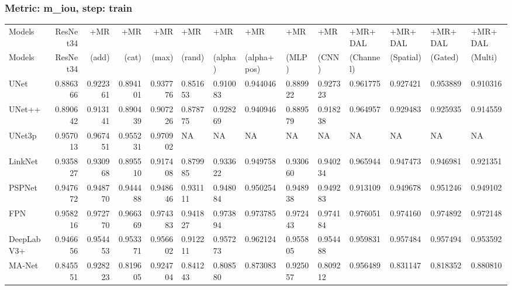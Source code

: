 \documentclass{article}
\begin{document}
\subsubsection{Metric: m\_iou, step: train}
\begin{tabular}{lrrrrlllllllll}
\toprule
Models & ResNet34 & +MR  & +MR  & +MR  & +MR  & +MR  & +MR  & +MR  & +MR  & +MR+DAL & +MR+DAL & +MR+DAL & +MR+DAL \\
Models & ResNet34 &  (add) &  (cat) &  (max) &  (rand) &  (alpha) &  (alpha+pos) &  (MLP) &  (CNN) & (Channel) & (Spatial) & (Gated) & (Multi) \\
\midrule
UNet & 0.886366 & 0.922361 & 0.894101 & 0.937776 & 0.851653 & 0.910083 & 0.944046 & 0.889922 & 0.927323 & 0.961775 & 0.927421 & 0.953889 & 0.910316 \\
UNet++ & 0.890642 & 0.913141 & 0.890439 & 0.907226 & 0.878775 & 0.928269 & 0.940946 & 0.889579 & 0.918238 & 0.964957 & 0.929483 & 0.925935 & 0.914559 \\
UNet3p & 0.957013 & 0.967451 & 0.955231 & 0.970902 & NA & NA & NA & NA & NA & NA & NA & NA & NA \\
LinkNet & 0.935827 & 0.930968 & 0.895510 & 0.917408 & 0.879985 & 0.933622 & 0.949758 & 0.930660 & 0.940234 & 0.965944 & 0.947473 & 0.946981 & 0.921351 \\
PSPNet & 0.947672 & 0.948770 & 0.944488 & 0.948646 & 0.931111 & 0.948084 & 0.950254 & 0.948938 & 0.949283 & 0.913109 & 0.949678 & 0.951246 & 0.949102 \\
FPN & 0.958216 & 0.972770 & 0.966369 & 0.974383 & 0.941827 & 0.973894 & 0.973785 & 0.972443 & 0.974184 & 0.976051 & 0.974160 & 0.974892 & 0.972148 \\
DeepLabV3+ & 0.946656 & 0.954453 & 0.953371 & 0.956602 & 0.912211 & 0.957273 & 0.962124 & 0.955805 & 0.954488 & 0.959831 & 0.957484 & 0.957494 & 0.953592 \\
MA-Net & 0.845551 & 0.928223 & 0.819605 & 0.924704 & 0.841243 & 0.808580 & 0.873083 & 0.925057 & 0.809212 & 0.956489 & 0.831147 & 0.818352 & 0.880810 \\
\bottomrule
\end{tabular}
\end{document}
